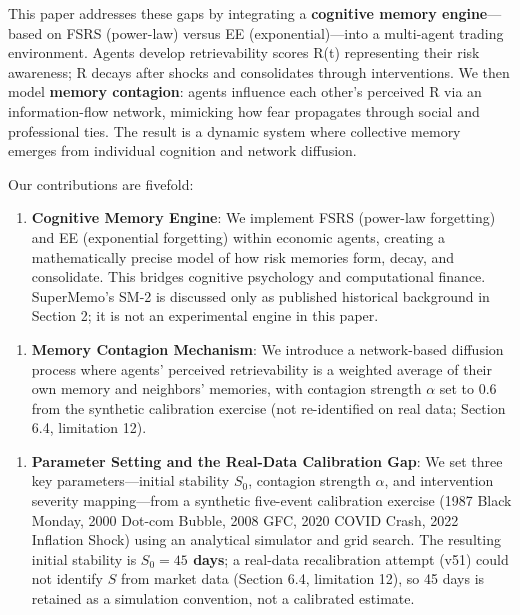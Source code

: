 \documentclass[11pt]{article}
\begin{document}
This paper addresses these gaps by integrating a \textbf{cognitive memory engine}---based on FSRS (power-law) versus EE (exponential)---into a multi-agent trading environment. Agents develop retrievability scores R(t) representing their risk awareness; R decays after shocks and consolidates through interventions. We then model \textbf{memory contagion}: agents influence each other's perceived R via an information-flow network, mimicking how fear propagates through social and professional ties. The result is a dynamic system where collective memory emerges from individual cognition and network diffusion.

Our contributions are fivefold:

\begin{enumerate}
\item \textbf{Cognitive Memory Engine}: We implement FSRS (power-law forgetting) and EE (exponential forgetting) within economic agents, creating a mathematically precise model of how risk memories form, decay, and consolidate. This bridges cognitive psychology and computational finance. SuperMemo's SM-2 is discussed only as published historical background in Section 2; it is not an experimental engine in this paper.
\end{enumerate}

\begin{enumerate}
\item \textbf{Memory Contagion Mechanism}: We introduce a network-based diffusion process where agents' perceived retrievability is a weighted average of their own memory and neighbors' memories, with contagion strength $\alpha$ set to 0.6 from the synthetic calibration exercise (not re-identified on real data; Section 6.4, limitation 12).
\end{enumerate}

\begin{enumerate}
\item \textbf{Parameter Setting and the Real-Data Calibration Gap}: We set three key parameters---initial stability $S_0$, contagion strength $\alpha$, and intervention severity mapping---from a synthetic five-event calibration exercise (1987 Black Monday, 2000 Dot-com Bubble, 2008 GFC, 2020 COVID Crash, 2022 Inflation Shock) using an analytical simulator and grid search. The resulting initial stability is \textbf{$S_0 = 45$ days}; a real-data recalibration attempt (v51) could not identify $S$ from market data (Section 6.4, limitation 12), so 45 days is retained as a simulation convention, not a calibrated estimate.
\end{enumerate}
\end{document}
